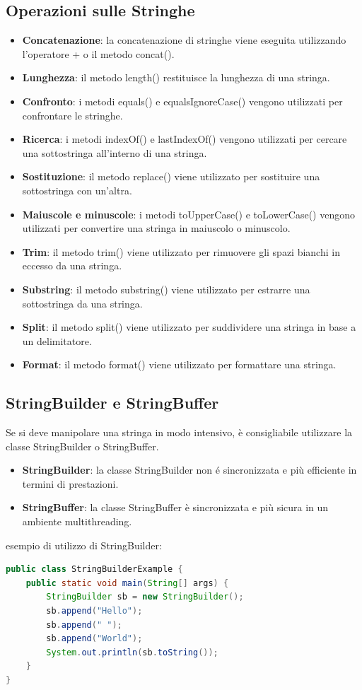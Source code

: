\documentclass[11pt]{article}
\begin{document}
\subsection{Operazioni sulle Stringhe}
\begin{itemize}
    \item \textbf{Concatenazione}: la concatenazione di stringhe viene eseguita utilizzando l'operatore + o il metodo concat().
    \item \textbf{Lunghezza}: il metodo length() restituisce la lunghezza di una stringa.
    \item \textbf{Confronto}: i metodi equals() e equalsIgnoreCase() vengono utilizzati per confrontare le stringhe.
    \item \textbf{Ricerca}: i metodi indexOf() e lastIndexOf() vengono utilizzati per cercare una sottostringa all'interno di una stringa.
    \item \textbf{Sostituzione}: il metodo replace() viene utilizzato per sostituire una sottostringa con un'altra.
    \item \textbf{Maiuscole e minuscole}: i metodi toUpperCase() e toLowerCase() vengono utilizzati per convertire una stringa in maiuscolo o minuscolo.
    \item \textbf{Trim}: il metodo trim() viene utilizzato per rimuovere gli spazi bianchi in eccesso da una stringa.
    \item \textbf{Substring}: il metodo substring() viene utilizzato per estrarre una sottostringa da una stringa.
    \item \textbf{Split}: il metodo split() viene utilizzato per suddividere una stringa in base a un delimitatore.
    \item \textbf{Format}: il metodo format() viene utilizzato per formattare una stringa.
\end{itemize}
\subsection{StringBuilder e StringBuffer}
Se si deve manipolare una stringa in modo intensivo, è consigliabile utilizzare la classe StringBuilder o StringBuffer.
\begin{itemize}
    \item \textbf{StringBuilder}: la classe StringBuilder non é sincronizzata e più efficiente in termini di prestazioni.
    \item \textbf{StringBuffer}: la classe StringBuffer è sincronizzata e più sicura in un ambiente multithreading.
\end{itemize}
esempio di utilizzo di StringBuilder:
\begin{lstlisting}[language=Java]
public class StringBuilderExample {
    public static void main(String[] args) {
        StringBuilder sb = new StringBuilder();
        sb.append("Hello");
        sb.append(" ");
        sb.append("World");
        System.out.println(sb.toString());
    }
}
\end{lstlisting}
\end{document}
